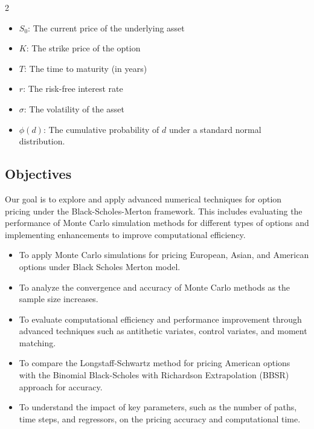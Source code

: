 \begin{multicols}{2}
\begin{itemize}
    \item \( S_0 \): The current price of the underlying asset
    \item \( K \): The strike price of the option
    \item \( T \): The time to maturity (in years)
    \item \( r \): The risk-free interest rate
    \item \( \sigma \): The volatility of the asset
    \item \( \phi(d) \): The cumulative probability of \( d \) under a standard normal distribution.
\end{itemize}
\subsection{Objectives}
Our goal is to explore and apply advanced numerical techniques for option pricing under the Black-Scholes-Merton framework. This includes evaluating the performance of Monte Carlo simulation methods for different types of options and implementing enhancements to improve computational efficiency.
\begin{itemize}
    \item To apply Monte Carlo simulations for pricing European, Asian, and American options under Black Scholes Merton model.
    \item To analyze the convergence and accuracy of Monte Carlo methods as the sample size increases.
    \item To evaluate computational efficiency and performance improvement through advanced techniques such as antithetic variates, control variates, and moment matching.
    \item To compare the Longstaff-Schwartz method for pricing American options with the Binomial Black-Scholes with Richardson Extrapolation (BBSR) approach for accuracy.
    \item To understand the impact of key parameters, such as the number of paths, time steps, and regressors, on the pricing accuracy and computational time.
\end{itemize}


\end{multicols}